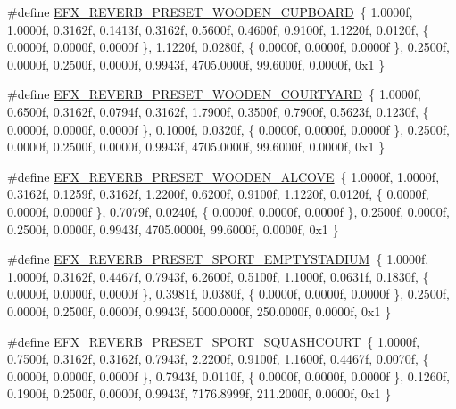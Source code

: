 \begin{DoxyCompactItemize}
\item 
\#define \hyperlink{efx-presets_8h_abdaf8eba9ef400263b72b92ef4d4ab23}{E\+F\+X\+\_\+\+R\+E\+V\+E\+R\+B\+\_\+\+P\+R\+E\+S\+E\+T\+\_\+\+W\+O\+O\+D\+E\+N\+\_\+\+C\+U\+P\+B\+O\+A\+RD}~\{ 1.\+0000f, 1.\+0000f, 0.\+3162f, 0.\+1413f, 0.\+3162f, 0.\+5600f, 0.\+4600f, 0.\+9100f, 1.\+1220f, 0.\+0120f, \{ 0.\+0000f, 0.\+0000f, 0.\+0000f \}, 1.\+1220f, 0.\+0280f, \{ 0.\+0000f, 0.\+0000f, 0.\+0000f \}, 0.\+2500f, 0.\+0000f, 0.\+2500f, 0.\+0000f, 0.\+9943f, 4705.\+0000f, 99.\+6000f, 0.\+0000f, 0x1 \}
\item 
\#define \hyperlink{efx-presets_8h_aab1028d9dc70b1bf4f86cf68d8eab1e2}{E\+F\+X\+\_\+\+R\+E\+V\+E\+R\+B\+\_\+\+P\+R\+E\+S\+E\+T\+\_\+\+W\+O\+O\+D\+E\+N\+\_\+\+C\+O\+U\+R\+T\+Y\+A\+RD}~\{ 1.\+0000f, 0.\+6500f, 0.\+3162f, 0.\+0794f, 0.\+3162f, 1.\+7900f, 0.\+3500f, 0.\+7900f, 0.\+5623f, 0.\+1230f, \{ 0.\+0000f, 0.\+0000f, 0.\+0000f \}, 0.\+1000f, 0.\+0320f, \{ 0.\+0000f, 0.\+0000f, 0.\+0000f \}, 0.\+2500f, 0.\+0000f, 0.\+2500f, 0.\+0000f, 0.\+9943f, 4705.\+0000f, 99.\+6000f, 0.\+0000f, 0x1 \}
\item 
\#define \hyperlink{efx-presets_8h_ab06028b7c454c3e43cc4caac83c461ac}{E\+F\+X\+\_\+\+R\+E\+V\+E\+R\+B\+\_\+\+P\+R\+E\+S\+E\+T\+\_\+\+W\+O\+O\+D\+E\+N\+\_\+\+A\+L\+C\+O\+VE}~\{ 1.\+0000f, 1.\+0000f, 0.\+3162f, 0.\+1259f, 0.\+3162f, 1.\+2200f, 0.\+6200f, 0.\+9100f, 1.\+1220f, 0.\+0120f, \{ 0.\+0000f, 0.\+0000f, 0.\+0000f \}, 0.\+7079f, 0.\+0240f, \{ 0.\+0000f, 0.\+0000f, 0.\+0000f \}, 0.\+2500f, 0.\+0000f, 0.\+2500f, 0.\+0000f, 0.\+9943f, 4705.\+0000f, 99.\+6000f, 0.\+0000f, 0x1 \}
\item 
\#define \hyperlink{efx-presets_8h_a568154406051fd0d23820deac501404a}{E\+F\+X\+\_\+\+R\+E\+V\+E\+R\+B\+\_\+\+P\+R\+E\+S\+E\+T\+\_\+\+S\+P\+O\+R\+T\+\_\+\+E\+M\+P\+T\+Y\+S\+T\+A\+D\+I\+UM}~\{ 1.\+0000f, 1.\+0000f, 0.\+3162f, 0.\+4467f, 0.\+7943f, 6.\+2600f, 0.\+5100f, 1.\+1000f, 0.\+0631f, 0.\+1830f, \{ 0.\+0000f, 0.\+0000f, 0.\+0000f \}, 0.\+3981f, 0.\+0380f, \{ 0.\+0000f, 0.\+0000f, 0.\+0000f \}, 0.\+2500f, 0.\+0000f, 0.\+2500f, 0.\+0000f, 0.\+9943f, 5000.\+0000f, 250.\+0000f, 0.\+0000f, 0x1 \}
\item 
\#define \hyperlink{efx-presets_8h_a25bb269e5c8e3bed033ba116fb4990e8}{E\+F\+X\+\_\+\+R\+E\+V\+E\+R\+B\+\_\+\+P\+R\+E\+S\+E\+T\+\_\+\+S\+P\+O\+R\+T\+\_\+\+S\+Q\+U\+A\+S\+H\+C\+O\+U\+RT}~\{ 1.\+0000f, 0.\+7500f, 0.\+3162f, 0.\+3162f, 0.\+7943f, 2.\+2200f, 0.\+9100f, 1.\+1600f, 0.\+4467f, 0.\+0070f, \{ 0.\+0000f, 0.\+0000f, 0.\+0000f \}, 0.\+7943f, 0.\+0110f, \{ 0.\+0000f, 0.\+0000f, 0.\+0000f \}, 0.\+1260f, 0.\+1900f, 0.\+2500f, 0.\+0000f, 0.\+9943f, 7176.\+8999f, 211.\+2000f, 0.\+0000f, 0x1 \}

\end{DoxyCompactItemize}
